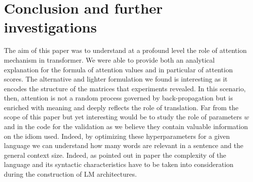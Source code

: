 \documentclass[11pt]{article}
\theoremstyle{plain}
\theoremstyle{remark}
\theoremstyle{definition}
\theoremstyle{plain}
\theoremstyle{plain}
\begin{document}
\section{Conclusion and further investigations}
The aim of this paper was to understand at a profound level the role of attention mechanism in transformer. We were able to provide both an analytical explanation for the formula of attention values and in particular of attention scores. The alternative and lighter formulation we found is interesting as it encodes the structure of the matrices that experiments revealed. In this scenario, then, attention is not a random process governed by back-propagation but is enriched with meaning and deeply reflects the role of translation. Far from the scope of this paper but yet interesting would be to study the role of parameters $w$ and  in the code for the validation as we believe they contain valuable information on the idiom used. Indeed, by optimizing these hyperparameters for a given language we can understand how many words are relevant in a sentence and the general context size. Indeed, as pointed out in paper \cite{Context} the complexity of the language and its syntactic characteristics have to be taken into
consideration during the construction of LM architectures.
\end{document}
